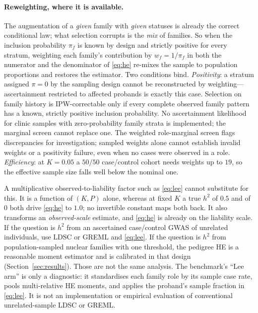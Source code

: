 \documentclass[11pt,a4paper]{article}
\newcommand{\h}{h^{2}}
\begin{document}
\paragraph{Reweighting, where it is available.}
The augmentation of a \emph{given} family with \emph{given} statuses
is already the correct conditional law; what selection corrupts is
the \emph{mix} of families.
So when the inclusion probability $\pi_f$ is known by design and
strictly positive for every stratum, weighting each family's
contribution by $w_f=1/\pi_f$ in both the numerator and the
denominator of \eqref{eq:he} re-mixes the sample to population
proportions and restores the estimator.
Two conditions bind.
\emph{Positivity}: a stratum assigned $\pi=0$ by the sampling design
cannot be reconstructed by weighting---ascertainment restricted to affected
probands is exactly this case. Selection on
family history is IPW-correctable only if every complete observed
family pattern has a known, strictly positive inclusion probability.
No ascertainment likelihood for clinic samples with zero-probability
family strata is implemented; the marginal screen cannot replace one.
The weighted role-marginal screen flags discrepancies for investigation;
sampled weights alone cannot establish invalid weights or a positivity
failure, even when no cases were observed in a role.
\emph{Efficiency}: at $K=0.05$ a $50/50$ case/control cohort needs
weights up to $19$, so the effective sample size falls well below
the nominal one.

A multiplicative observed-to-liability factor such as
\eqref{eq:lee} cannot substitute for this.
It is a function of $(K,P)$ alone, whereas at fixed $K$ a true $\h$
of $0.5$ and of $0$ both drive \eqref{eq:he} to $1.0$; no invertible
constant maps both back.
It also transforms an \emph{observed-scale} estimate, and
\eqref{eq:he} is already on the liability scale.
If the question is $\h$ from an ascertained case/control GWAS of
unrelated individuals, use LDSC or GREML and \eqref{eq:lee}.
If the question is $\h$ from population-sampled nuclear families
with one threshold, the pedigree HE is a reasonable moment
estimator and is calibrated in that design
(Section~\ref{sec:results}).
Those are not the same analysis.
The benchmark's ``Lee arm'' is only a diagnostic: it standardises
each family role by its sample case rate, pools multi-relative HE
moments, and applies the proband's sample fraction in \eqref{eq:lee}.
It is not an implementation or empirical evaluation of conventional
unrelated-sample LDSC or GREML.

\end{document}
